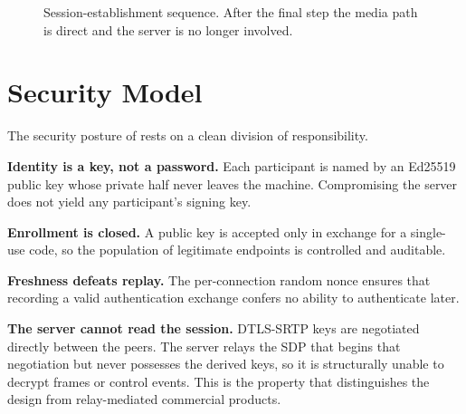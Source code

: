 \begin{figure}[H]
\centering
{}
\caption{Session-establishment sequence. After the final step the media path is
direct and the server is no longer involved.}
\label{fig:session}
\end{figure}

\section{Security Model}

The security posture of \updesk{} rests on a clean division of responsibility.

\textbf{Identity is a key, not a password.} Each participant is named by an
Ed25519 public key whose private half never leaves the machine. Compromising the
server does not yield any participant's signing key.

\textbf{Enrollment is closed.} A public key is accepted only in exchange for a
single-use code, so the population of legitimate endpoints is controlled and
auditable.

\textbf{Freshness defeats replay.} The per-connection random nonce ensures that
recording a valid authentication exchange confers no ability to authenticate
later.

\textbf{The server cannot read the session.} DTLS-SRTP keys are negotiated
directly between the peers. The server relays the SDP that begins that
negotiation but never possesses the derived keys, so it is structurally unable
to decrypt frames or control events. This is the property that distinguishes the
design from relay-mediated commercial products.

